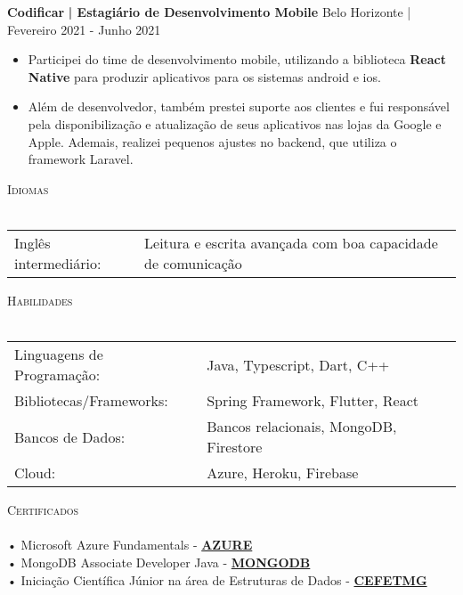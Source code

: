 \documentclass[a4paper]{article}
\newcommand{\lineunder} {
    \vspace*{-8pt} \\
    \hspace*{-18pt} \hrulefill \\
}
\newcommand{\header} [1] {
    {\hspace*{-18pt}\vspace*{6pt} \textsc{#1}}
    \vspace*{-6pt} \lineunder
}
\begin{document}
\textbf{Codificar}\textbf{ | Estagiário de Desenvolvimento Mobile} \hfill Belo Horizonte | Fevereiro 2021 - Junho 2021\\
\vspace{-4mm}
\begin{itemize} \itemsep -1pt
    \vspace{2mm}
    \item[] Participei do time de desenvolvimento mobile, utilizando a biblioteca \textbf{React Native} para produzir aplicativos para os sistemas android e ios.
    \item[] Além de desenvolvedor, também prestei suporte aos clientes e fui responsável pela disponibilização e atualização de seus aplicativos nas lojas da Google e Apple. Ademais, realizei pequenos ajustes no backend, que utiliza o framework Laravel.
\end{itemize}

%
%
\header{Idiomas}
\vspace{2mm}
\begin{longtable}{p{6cm}p{12cm}}
    Inglês intermediário: & Leitura e escrita avançada com boa capacidade de comunicação \\
\end{longtable}
\vspace{1mm}

%
%
\header{Habilidades}
\vspace{2mm}
\begin{longtable}{p{6cm}p{12cm}}
    Linguagens de Programação: & Java, Typescript, Dart, C++            \\
    Bibliotecas/Frameworks:    & Spring Framework, Flutter, React       \\
    Bancos de Dados:           & Bancos relacionais, MongoDB, Firestore \\
    Cloud:                     & Azure, Heroku, Firebase                \\
\end{longtable}
\vspace{1mm}

%
%
\header{Certificados}
\vspace{2mm}
• Microsoft Azure Fundamentals - \textbf{\href{https://learn.microsoft.com/pt-br/users/guilhermeaugustodeoliveira-7506/credentials/d8dc0a889b4f36a4}{AZURE}}\\
• MongoDB Associate Developer Java - \textbf{\href{https://www.credly.com/badges/7351ea72-bb6b-4375-b931-b43dd5ba7112/public_url}{MONGODB}}\\
• Iniciação Científica Júnior na área de Estruturas de Dados - \textbf{\href{https://drive.google.com/file/d/19xVXYNmpk2HWkNqeHK4gTZRdipjeWM1M/view?usp=sharing}{CEFETMG}}\\
\end{document}
